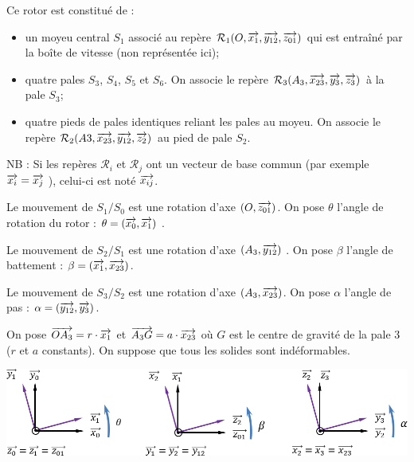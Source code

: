 \documentclass[10pt,fleqn]{article} %
\begin{document}
\begin{multicols}{2}
Ce rotor est constitué de :
\begin{itemize}
\item un moyeu central $S_1$ associé au repère $\mathcal{R}_1(O,\overrightarrow{x_1},\overrightarrow{y_{12}},\overrightarrow{z_{01}})$ qui est entraîné par la boîte de vitesse (non
représentée ici);
\item quatre pales $S_3$, $S_4$, $S_5$ et $S_6$. On associe le repère $\mathcal{R}_3(A_3,\overrightarrow{x_{23}},\overrightarrow{y_3},\overrightarrow{z_3} )$ à la pale $S_3$;
\item quatre pieds de pales identiques reliant les pales au moyeu. On associe le repère
$\mathcal{R}_2(A3,\overrightarrow{x_{23}},\overrightarrow{y_{12}},\overrightarrow{z_2} )$ au pied de pale $S_2$.
\end{itemize}

NB : Si les repères $\mathcal{R}_i$ et $\mathcal{R}_j$ ont un vecteur de base commun (par exemple $\overrightarrow{x_i}= \overrightarrow{x_j}$ ), celui-ci est noté $\overrightarrow{x_{ij}}$.


Le mouvement de $S_1/S_0$ est une rotation d'axe $(O,\overrightarrow{z_{01}})$. On pose $\theta$ l’angle de rotation du rotor : $\theta = (\overrightarrow{x_0},\overrightarrow{x_1})$ .

Le mouvement de $S_2/S_1$ est une rotation d'axe $(A_3,\overrightarrow{y_{12}})$ . On pose $\beta$ l’angle de battement : $\beta = (\overrightarrow{x_1},\overrightarrow{x_{23}})$.

Le mouvement de $S_3/S_2$ est une rotation d'axe $(A_3,\overrightarrow{x_{23}})$. On pose $\alpha$ l’angle de pas : $\alpha = (\overrightarrow{y_{12}},\overrightarrow{y_3})$.

On pose $\overrightarrow{OA_3} = r\cdot \overrightarrow{x_1}$ et $\overrightarrow{A_3G}=a\cdot \overrightarrow{x_{23}}$ où $G$ est le centre de gravité de la pale 3 ($r$ et $a$ constants). On suppose que tous les solides sont indéformables.


\begin{center}
\includegraphics[width=.9\linewidth]{images/cor1}
\end{center}

\fi


\end{multicols}
\end{document}
